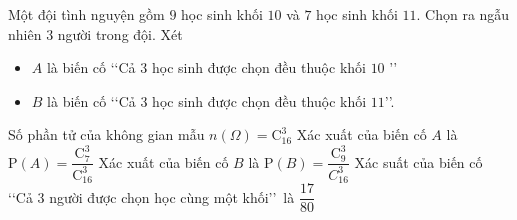 \begin{ex}%
 Một đội tình nguyện gồm $9$ học sinh khối $10$ và $7$ học sinh  khối $11$. Chọn ra ngẫu nhiên $3$ người trong đội. Xét
 \begin{itemize}
  \item $A$  là biến cố \lq\lq Cả $3$ học sinh được chọn đều thuộc khối $10$ \rq\rq
  \item $B$ là biến cố \lq\lq Cả $3$ học sinh  được chọn đều thuộc khối $11$\rq\rq.
 \end{itemize}
  \choiceTF
  {\True  Số phần tử của không gian mẫu $n(\Omega)=\mathrm{C}_{16}^3$}
   {Xác xuất của biến cố $A$ là $\mathrm{P}(A)=\dfrac{\mathrm{C}_7^3}{\mathrm{C}_{16}^3}$}
  {Xác xuất của biến cố $B$ là  $\mathrm{P}(B)=\dfrac{\mathrm{C}_9^3}{C_{16}^3}$}
  {\True Xác suất của biến cố \lq\lq  Cả $3$ người được chọn học cùng một khối\rq\rq\, là $\dfrac{17}{80}$}
\end{ex}

